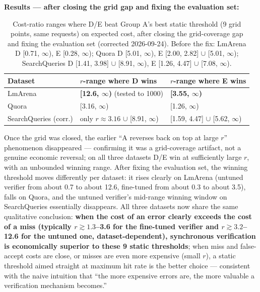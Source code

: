 \documentclass[11pt]{article}
\newenvironment{fittab}{\begin{lrbox}{\fittabbox}}{\end{lrbox}%
  \ifdim\wd\fittabbox>\linewidth\resizebox{\linewidth}{!}{\usebox{\fittabbox}}\else\usebox{\fittabbox}\fi}
\begin{document}
\textbf{Results --- after closing the grid gap and fixing the evaluation set:}

\begin{table}[h]
\centering
\small
\begin{fittab}\begin{tabular}{@{}lll@{}}
\toprule
\textbf{Dataset} & \textbf{$r$-range where D wins} & \textbf{$r$-range where E wins} \\
\midrule
LmArena & \textbf{[12.6, $\infty$)} (tested to 1000) & \textbf{[3.55, $\infty$)} \\
Quora & [3.16, $\infty$) & [1.26, $\infty$) \\
SearchQueries (corr.) & only $r\approx3.16$ $\cup$ [8.91, $\infty$) & [1.59, 4.47] $\cup$ [5.62, $\infty$) \\
\bottomrule
\end{tabular}\end{fittab}
\caption{Cost-ratio ranges where D/E beat Group A's best static threshold (9 grid points, same requests) on expected cost, after closing the grid-coverage gap and fixing the evaluation set (corrected 2026-09-24). Before the fix: LmArena D [0.71, $\infty$), E [0.28, $\infty$); Quora D [5.01, $\infty$), E [2.00, 2.82] $\cup$ [5.01, $\infty$); SearchQueries D [1.41, 3.98] $\cup$ [8.91, $\infty$), E [1.26, 4.47] $\cup$ [7.08, $\infty$).}
\end{table}

Once the grid was closed, the earlier ``A reverses back on top at large $r$'' phenomenon disappeared --- confirming it was a grid-coverage artifact, not a genuine economic reversal; on all three datasets D/E win at sufficiently large $r$, with an unbounded winning range. After fixing the evaluation set, the winning threshold moves differently per dataset: it rises clearly on LmArena (untuned verifier from about 0.7 to about 12.6, fine-tuned from about 0.3 to about 3.5), falls on Quora, and the untuned verifier's mid-range winning window on SearchQueries essentially disappears. All three datasets now share the same qualitative conclusion: \textbf{when the cost of an error clearly exceeds the cost of a miss (typically $r\gtrsim1.3$--3.6 for the fine-tuned verifier and $r\gtrsim3.2$--12.6 for the untuned one, dataset-dependent), synchronous verification is economically superior to these 9 static thresholds}; when miss and false-accept costs are close, or misses are even more expensive (small $r$), a static threshold aimed straight at maximum hit rate is the better choice --- consistent with the naive intuition that ``the more expensive errors are, the more valuable a verification mechanism becomes.''
\end{document}
